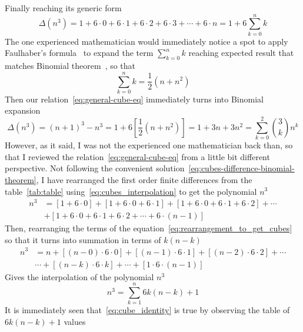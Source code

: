 Finally reaching its generic form
\begin{equation}
    \Delta(n^3) = 1+6\cdot0+6\cdot1+6\cdot2+6\cdot3+\cdots+6\cdot n = 1 + 6 \sum_{k=0}^{n} k\label{eq:general-cube-eq}
\end{equation}
The one experienced mathematician would immediately notice a spot to apply Faulhaber's formula~\cite{beardon1996sums}
to expand the term $\sum_{k=0}^{n} k$ reaching expected result that matches Binomial theorem~\cite{abramowitz1988handbook},
so that
\begin{equation*}
    \sum_{k=0}^{n} k = \frac{1}{2}(n+n^2)
\end{equation*}
Then our relation~\eqref{eq:general-cube-eq} immediately turns into Binomial expansion
\begin{equation}
    \Delta(n^3) = (n+1)^3 - n^3 = 1 + 6 \left[ \frac{1}{2}(n+n^2) \right] = 1 + 3 n + 3 n^2 = \sum_{k=0}^{2} \binom{3}{k} n^k
    \label{eq:cubes-difference-binomial-theorem}
\end{equation}
However, as it said, I was not the experienced one mathematician back than,
so that I reviewed the relation~\eqref{eq:general-cube-eq} from a little bit different perspective.
Not following the convenient solution~\eqref{eq:cubes-difference-binomial-theorem},
I have rearranged the first order finite differences from the table~\eqref{tab:table} using~\eqref{eq:cubes_interpolation}
to get the polynomial $n^3$
\begin{align}
    \label{eq:rearrangement_to_get_cubes}
    n^3 &= [1+6\cdot0]+[1+6\cdot0+6\cdot1]+[1+6\cdot0+6\cdot1+6\cdot2]+\cdots \nonumber \\
    &+[1+6\cdot0+6\cdot1+6\cdot2+\cdots+6\cdot(n-1)]
\end{align}
Then, rearranging the terms of the equation~\eqref{eq:rearrangement_to_get_cubes} so that it turns into summation
in terms of $k (n-k)$
\begin{equation*}
    \begin{split}
        n^3 &= n + [(n-0) \cdot 6 \cdot 0] + [(n-1)\cdot6\cdot1] + [(n-2)\cdot6\cdot2] + \cdots \\
        &\cdots + [(n-k)\cdot 6 \cdot k] + \cdots + [1\cdot6\cdot(n-1)]
    \end{split}
\end{equation*}
Gives the interpolation of the polynomial $n^3$
\begin{equation}
    \label{eq:cube_identity}
    n^3 = \sum_{k=1}^{n} 6k(n-k) + 1
\end{equation}
It is immediately seen that~\eqref{eq:cube_identity} is true by observing the table of $6k(n-k) + 1$ values
